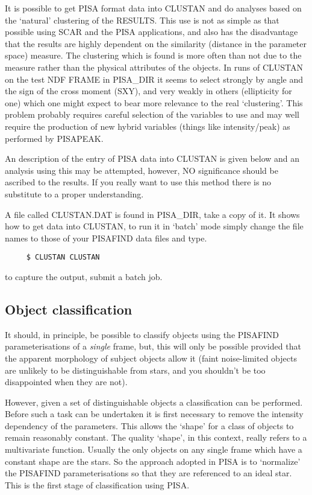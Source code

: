It is possible to get PISA format data into CLUSTAN and do analyses
based on the `natural' clustering of the RESULTS. This use is not as
simple as that possible using SCAR and the PISA applications, and also has
the disadvantage that the results are highly dependent on the similarity
(distance in the parameter space) measure. The clustering which is found
is more often than not due to the measure rather than the physical
attributes of the objects. In runs of CLUSTAN on the test NDF FRAME in
PISA\_DIR it seems to select strongly by angle and the sign of the cross
moment (SXY), and very weakly in others (ellipticity for one) which one
might expect to bear more relevance to the real `clustering'. This
problem probably requires careful selection of the variables to use and
may well require the production of new hybrid variables (things like
intensity/peak) as performed by PISAPEAK.

An description of the entry of PISA data into CLUSTAN is given below and an
analysis using this may be attempted, however, NO significance  should be
ascribed to the results. If you really want to use this method there is no
substitute to a proper understanding.

A file called CLUSTAN.DAT is found in PISA\_DIR, take a copy of it. It
shows how to get data into CLUSTAN, to run it in `batch' mode simply
change the file names to those of your PISAFIND data files and type.
\begin{verbatim}
     $ CLUSTAN CLUSTAN
\end{verbatim}
to capture the output, submit a batch job. 

\subsection{Object classification}

It should, in principle, be possible to classify objects using the
PISAFIND parameterisations of a {\em single} frame, but, this will only
be possible provided that the apparent morphology of subject objects
allow it (faint noise-limited objects are unlikely to be distinguishable
from stars, and you shouldn't be too disappointed when they are not). 

However, given a set of distinguishable objects a classification can be
performed. Before such a task can be undertaken it is first necessary to
remove the intensity dependency of the parameters. This allows the
`shape' for a class of objects to remain reasonably constant. The
quality `shape', in this context, really refers to a multivariate
function. Usually the only objects on any single frame which have a
constant shape are the stars. So the approach adopted in PISA is to
`normalize' the PISAFIND parameterisations so that they are referenced
to an ideal star. This is the first stage of classification using PISA.

